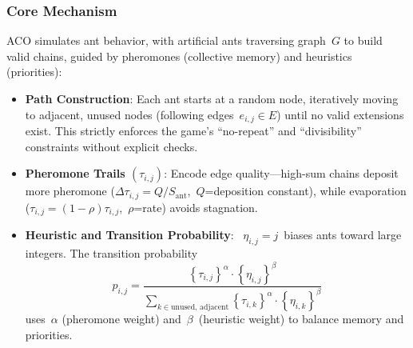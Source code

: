 \documentclass[twocolumn, a4paper]{article}
\begin{document}
\subsubsection{Core Mechanism}
ACO simulates ant behavior, with artificial ants traversing graph $G$ to build valid chains, guided by pheromones (collective memory) and heuristics (priorities):
\begin{itemize}
    \item \textbf{Path Construction}: Each ant starts at a random node, iteratively moving to adjacent, unused nodes (following edges $e_{i,j} \in E$) until no valid extensions exist. This strictly enforces the game's ``no-repeat'' and ``divisibility'' constraints without explicit checks.
    \item \textbf{Pheromone Trails $(\tau_{i,j})$}: Encode edge quality—high-sum chains deposit more pheromone (\(\Delta \tau_{i,j}=Q/S_{\text{ant}}\), $Q$=deposition constant), while evaporation (\(\tau_{i,j}=(1-\rho)\tau_{i,j}\), \(\rho\)=rate) avoids stagnation.
    \item \textbf{Heuristic and Transition Probability}:  $\eta_{i,j}=j$ biases ants toward large integers. The transition probability $$p_{i,j} = \frac{ \left\{ \tau_{i,j} \right\}^{\alpha} \cdot \left\{ \eta_{i,j} \right\}^{\beta} }{ \sum_{k \in \text{unused, adjacent}} \left\{ \tau_{i,k} \right\}^{\alpha} \cdot \left\{ \eta_{i,k} \right\}^{\beta} }$$ uses $\alpha$ (pheromone weight) and $\beta$ (heuristic weight) to balance memory and priorities.
\end{itemize}
\end{document}
